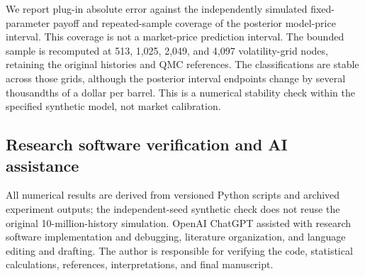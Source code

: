 We report plug-in absolute error against the independently simulated
fixed-parameter payoff and repeated-sample coverage of the posterior
model-price interval. This coverage is not a market-price prediction
interval. The bounded sample is recomputed at 513, 1,025, 2,049, and 4,097
volatility-grid nodes, retaining the original histories and QMC
references. The classifications are stable across those grids, although
the posterior interval endpoints change by several thousandths of
a dollar per barrel. This is a numerical stability check within the
specified synthetic model, not market calibration.

\subsection{Research software verification and AI assistance}

All numerical results are derived from versioned Python scripts and archived
experiment outputs; the independent-seed synthetic check does not reuse the
original 10-million-history simulation. OpenAI ChatGPT assisted with research
software implementation and debugging, literature organization, and language
editing and drafting. The author is responsible for verifying the code,
statistical calculations, references, interpretations, and final manuscript.
